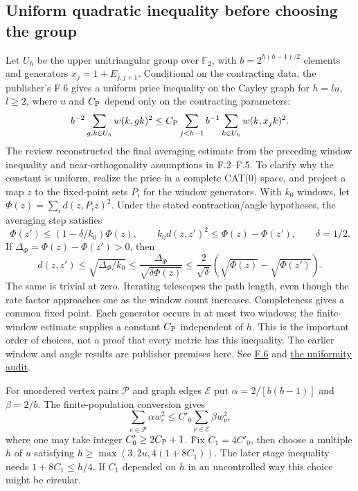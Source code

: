 \documentclass[11pt,letterpaper]{article}
\theoremstyle{definition}\newtheorem{definition}[theorem]{Definition}\newtheorem{example}[theorem]{Example}
\theoremstyle{remark}\newtheorem{remark}[theorem]{Remark}
\newcommand{\F}{\mathbb{F}}
\newcommand{\pub}[3]{\href{https://github.com/anthropics/formal-math/blob/11b6c7e3c927df2658f513b6b68ea7f8929c62c5/vp-vnp/#1\#L#2}{#3}}
\newcommand{\aud}[2]{\href{https://github.com/nousentllc/VP-VNP-Review/blob/567303d0bcf4f9d54390437b137752446e58ccd6/#1}{#2}}
\begin{document}
\subsection{Uniform quadratic inequality before choosing the group}\label{sec:groups}
Let $U_h$ be the upper unitriangular group over $\F_2$, with $b=2^{h(h-1)/2}$ elements and generators $x_j=1+E_{j,j+1}$. Conditional on the contracting data, the publisher's F.6 gives a uniform price inequality on the Cayley graph for $h=lu$, $l\ge2$, where $u$ and $C_{\rm P}$ depend only on the contracting parameters:
\[
 b^{-2}\sum_{g,k\in U_h}w(k,gk)^2
 \le C_{\rm P}\sum_{j<h-1}b^{-1}\sum_{k\in U_h}w(k,x_jk)^2.
\]
The review reconstructed the final averaging estimate from the preceding window inequality and near-orthogonality assumptions in F.2--F.5. To clarify why the constant is uniform, realize the price in a complete CAT(0) space, and project a map $z$ to the fixed-point sets $P_i$ for the window generators. With $k_0$ windows, let $\Phi(z)=\sum_i d(z,P_i z)^2$. Under the stated contraction/angle hypotheses, the averaging step satisfies
\[
 \Phi(z')\le(1-\delta/k_0)\Phi(z),\qquad
 k_0 d(z,z')^2\le\Phi(z)-\Phi(z'),\qquad \delta=1/2.
\]
If $\Delta_\Phi=\Phi(z)-\Phi(z')>0$, then
\[
 d(z,z')\le\sqrt{\Delta_\Phi/k_0}
 \le\frac{\Delta_\Phi}{\sqrt{\delta\Phi(z)}}
 \le\frac{2}{\sqrt\delta}(\sqrt{\Phi(z)}-\sqrt{\Phi(z')}).
\]
The same is trivial at zero. Iterating telescopes the path length, even though the rate factor approaches one as the window count increases. Completeness gives a common fixed point. Each generator occurs in at most two windows; the finite-window estimate supplies a constant $C_{\rm P}$ independent of $h$. This is the important order of choices, not a proof that every metric has this inequality. The earlier window and angle results are publisher premises here. See \pub{Paper/Groups.lean}{1085}{F.6} and \aud{passes/pass13B-gain.md}{the uniformity audit}.

For unordered vertex pairs $\mathcal P$ and graph edges $\mathcal E$ put $\alpha=2/[b(b-1)]$ and $\beta=2/b$. The finite-population conversion gives
\begin{equation}\label{eq:poinc}
 \sum_{e\in\mathcal P}\alpha w_e^2\le C'_0\sum_{\nu\in\mathcal E}\beta w_\nu^2,
\end{equation}
where one may take integer $C'_0\ge2C_{\rm P}+1$. Fix $C_1=4C'_0$, then choose a multiple $h$ of $u$ satisfying $h\ge\max(3,2u,4(1+8C_1))$. The later stage inequality needs $1+8C_1\le h/4$. If $C_1$ depended on $h$ in an uncontrolled way this choice might be circular.
\end{document}
